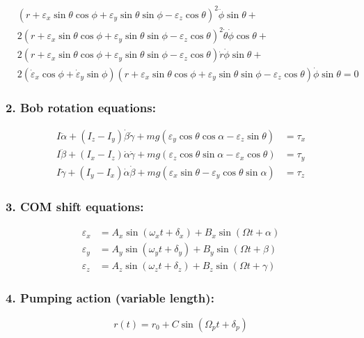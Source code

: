\documentclass{article}
\begin{document}
\begin{align*}
&(r + \varepsilon_x\sin \theta\cos \phi + \varepsilon_y\sin \theta\sin \phi - \varepsilon_z\cos \theta)^2\ddot{\phi}\sin \theta + \\
&2(r + \varepsilon_x\sin \theta\cos \phi + \varepsilon_y\sin \theta\sin \phi - \varepsilon_z\cos \theta)^2\dot{\theta}\dot{\phi}\cos \theta + \\
&2(r + \varepsilon_x\sin \theta\cos \phi + \varepsilon_y\sin \theta\sin \phi - \varepsilon_z\cos \theta)\dot{r}\dot{\phi}\sin \theta + \\
&2(\dot{\varepsilon}_x\cos \phi + \dot{\varepsilon}_y\sin \phi)(r + \varepsilon_x\sin \theta\cos \phi + \varepsilon_y\sin \theta\sin \phi - \varepsilon_z\cos \theta)\dot{\phi}\sin \theta = 0
\end{align*}

\subsubsection{2. Bob rotation equations:}
\begin{align*}
I\ddot{\alpha} + (I_z - I_y)\dot{\beta}\dot{\gamma} + mg(\varepsilon_y\cos \theta\cos \alpha - \varepsilon_z\sin \theta) &= \tau_x \\
I\ddot{\beta} + (I_x - I_z)\dot{\alpha}\dot{\gamma} + mg(\varepsilon_z\cos \theta\sin \alpha - \varepsilon_x\cos \theta) &= \tau_y \\
I\ddot{\gamma} + (I_y - I_x)\dot{\alpha}\dot{\beta} + mg(\varepsilon_x\sin \theta - \varepsilon_y\cos \theta\sin \alpha) &= \tau_z
\end{align*}

\subsubsection{3. COM shift equations:}
\begin{align*}
\varepsilon_x &= A_x\sin(\omega_x t + \delta_x) + B_x\sin(\Omega t + \alpha) \\
\varepsilon_y &= A_y\sin(\omega_y t + \delta_y) + B_y\sin(\Omega t + \beta) \\
\varepsilon_z &= A_z\sin(\omega_z t + \delta_z) + B_z\sin(\Omega t + \gamma)
\end{align*}

\subsubsection{4. Pumping action (variable length):}
\begin{equation*}
r(t) = r_0 + C\sin(\Omega_p t + \delta_p)
\end{equation*}
\end{document}

